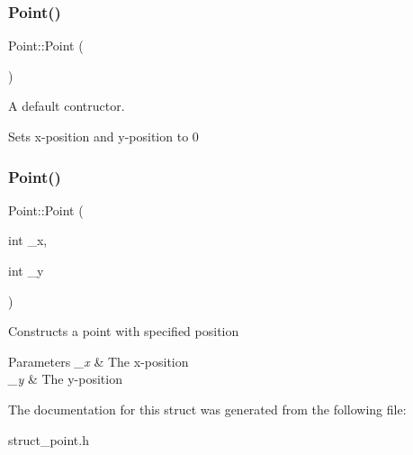\subsubsection{\texorpdfstring{Point()}{Point()}\hspace{0.1cm}{\footnotesize\ttfamily [1/2]}}
{\footnotesize\ttfamily Point\+::\+Point (\begin{DoxyParamCaption}{ }\end{DoxyParamCaption})\hspace{0.3cm}{\ttfamily [inline]}}



A default contructor. 

Sets x-\/position and y-\/position to 0 \mbox{\label{structPoint_acf2d96a374f9b7c9c636ba1a2ad42f02}} 
\subsubsection{\texorpdfstring{Point()}{Point()}\hspace{0.1cm}{\footnotesize\ttfamily [2/2]}}
{\footnotesize\ttfamily Point\+::\+Point (\begin{DoxyParamCaption}\item[{int}]{\+\_\+x,  }\item[{int}]{\+\_\+y }\end{DoxyParamCaption})\hspace{0.3cm}{\ttfamily [inline]}}

Constructs a point with specified position 
\begin{DoxyParams}{Parameters}
{\em \+\_\+x} & The x-\/position \\
\hline
{\em \+\_\+y} & The y-\/position \\
\hline
\end{DoxyParams}


The documentation for this struct was generated from the following file\+:\begin{DoxyCompactItemize}
\item 
struct\+\_\+point.\+h\end{DoxyCompactItemize}
